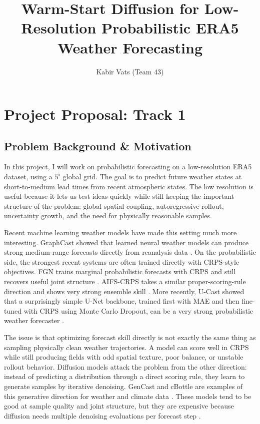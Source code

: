 \documentclass{article}
\title{ Warm-Start Diffusion for Low-Resolution Probabilistic ERA5 Weather Forecasting}
\author{%
  Kabir Vats (Team 43)
}
\begin{document}
\maketitle

\section{Project Proposal: Track 1}

\subsection{Problem Background \& Motivation}

In this project, I will work on probabilistic forecasting on a low-resolution ERA5 dataset, using a $5^\circ$ global grid. The goal is to predict future weather states at short-to-medium lead times from recent atmospheric states. The low resolution is useful because it lets us test ideas quickly while still keeping the important structure of the problem: global spatial coupling, autoregressive rollout, uncertainty growth, and the need for physically reasonable samples.

Recent machine learning weather models have made this setting much more interesting. GraphCast showed that learned neural weather models can produce strong medium-range forecasts directly from reanalysis data \citep{lam2023graphcast}. On the probabilistic side, the strongest recent systems are often trained directly with CRPS-style objectives. FGN trains marginal probabilistic forecasts with CRPS and still recovers useful joint structure \citep{alet2025fgn}. AIFS-CRPS takes a similar proper-scoring-rule direction and shows very strong ensemble skill \citep{lang2026aifscrps}. More recently, U-Cast showed that a surprisingly simple U-Net backbone, trained first with MAE and then fine-tuned with CRPS using Monte Carlo Dropout, can be a very strong probabilistic weather forecaster \citep{cachay2026ucast}.

The issue is that optimizing forecast skill directly is not exactly the same thing as sampling physically clean weather trajectories. A model can score well in CRPS while still producing fields with odd spatial texture, poor balance, or unstable rollout behavior. Diffusion models attack the problem from the other direction: instead of predicting a distribution through a direct scoring rule, they learn to generate samples by iterative denoising. GenCast and cBottle are examples of this generative direction for weather and climate data \citep{price2025gencast,brenowitz2025cbottle}. These models tend to be good at sample quality and joint structure, but they are expensive because diffusion needs multiple denoising evaluations per forecast step \citep{ho2020ddpm,salimans2022progressive}.
\end{document}
